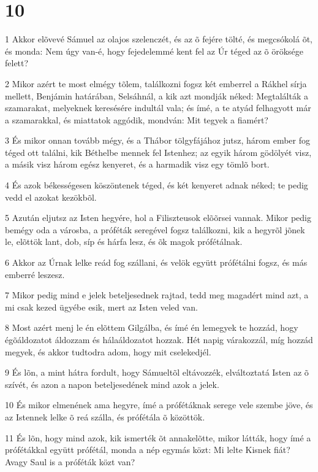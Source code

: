 \chapter{10}

\par 1 Akkor elõvevé Sámuel az olajos szelenczét, és az õ fejére tölté, és megcsókolá õt, és monda: Nem úgy van-é, hogy fejedelemmé kent fel az Úr téged az õ öröksége felett?
\par 2 Mikor azért te most elmégy tõlem, találkozni fogsz két emberrel a Rákhel sírja mellett, Benjámin határában, Selsáhnál, a kik azt mondják néked: Megtalálták a szamarakat, melyeknek keresésére indultál vala; és ímé, a te atyád felhagyott már a szamarakkal, és miattatok aggódik, mondván: Mit tegyek a fiamért?
\par 3 És mikor onnan tovább mégy, és a Thábor tölgyfájához jutsz, három ember fog téged ott találni, kik Béthelbe mennek fel Istenhez; az egyik három gödölyét visz, a másik visz három egész kenyeret, és a harmadik visz egy tömlõ bort.
\par 4 És azok békességesen köszöntenek téged, és két kenyeret adnak néked; te pedig vedd el azokat kezökbõl.
\par 5 Azután eljutsz az Isten hegyére, hol a Filiszteusok elõõrsei vannak. Mikor pedig bemégy oda a városba, a próféták seregével fogsz találkozni, kik a hegyrõl jõnek le, elõttök lant, dob, síp és hárfa lesz, és õk magok prófétálnak.
\par 6 Akkor az Úrnak lelke reád fog szállani, és velök együtt prófétálni fogsz, és más emberré leszesz.
\par 7 Mikor pedig mind e jelek beteljesednek rajtad, tedd meg magadért mind azt, a mi csak kezed ügyébe esik, mert az Isten veled van.
\par 8 Most azért menj le én elõttem Gilgálba, és ímé én lemegyek te hozzád, hogy égõáldozatot áldozzam és hálaáldozatot hozzak. Hét napig várakozzál, míg hozzád megyek, és akkor tudtodra adom, hogy mit cselekedjél.
\par 9 És lõn, a mint hátra fordult, hogy Sámueltõl eltávozzék, elváltoztatá Isten az õ szívét, és azon a napon beteljesedének mind azok a jelek.
\par 10 És mikor elmenének ama hegyre, ímé a prófétáknak serege vele szembe jöve, és az Istennek lelke õ reá szálla, és prófétála õ közöttök.
\par 11 És lõn, hogy mind azok, kik ismerték õt annakelõtte, mikor látták, hogy ímé a prófétákkal együtt prófétál, monda a nép egymás közt: Mi lelte Kisnek fiát? Avagy Saul is a próféták közt van?
